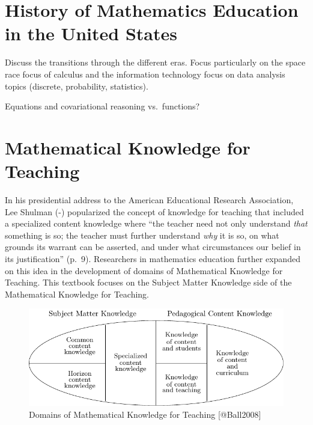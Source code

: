 \documentclass[
]{book}
\theoremstyle{definition}
\theoremstyle{definition}
\theoremstyle{definition}
\theoremstyle{definition}
\theoremstyle{remark}
\begin{document}
\newpage

\hypertarget{MathEdHistory}{%
\section{History of Mathematics Education in the United States}\label{MathEdHistory}}

Discuss the transitions through the different eras. Focus particularly on the space race focus of calculus and the information technology focus on data analysis topics (discrete, probability, statistics).

Equations and covariational reasoning vs.~functions?

\hypertarget{MKT}{%
\section{Mathematical Knowledge for Teaching}\label{MKT}}

In his presidential address to the American Educational Research Association, Lee Shulman (-\citet{shulman1986}) popularized the concept of knowledge for teaching that included a specialized content knowledge where ``the teacher need not only understand \emph{that} something is so; the teacher must further understand \emph{why} it is so, on what grounds its warrant can be asserted, and under what circumstances our belief in its justification'' (p.~9). Researchers in mathematics education further expanded on this idea in the development of domains of Mathematical Knowledge for Teaching. This textbook focuses on the Subject Matter Knowledge side of the Mathematical Knowledge for Teaching.

\begin{figure}

{\centering \includegraphics[width=1\linewidth]{tikz/ballegg1} 

}

\caption{Domains of Mathematical Knowledge for Teaching [@Ball2008]}\label{fig:unnamed-chunk-3}
\end{figure}
\end{document}
